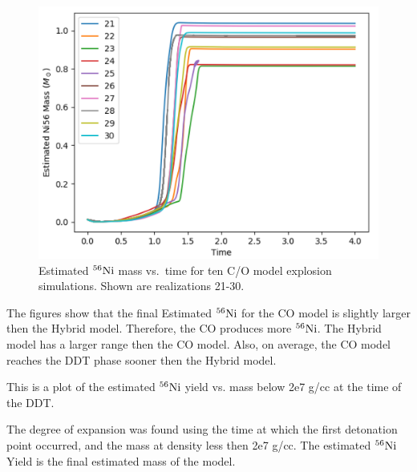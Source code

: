 \documentclass[iop,apj]{emulateapj}
\newcommand{\Ni}[1]{\ensuremath{{}^{#1}{\rm Ni}}}
\begin{document}
\begin{figure}
\includegraphics[width=\columnwidth]{figures/ni56_vs_time_CO.png}
\caption{\label{fig:nitco}
Estimated \Ni{56} mass vs.\ time for ten C/O model explosion simulations.
Shown are realizations 21-30. 
}
\end{figure}

The figures show that the final Estimated \Ni{56} for the CO model is
slightly larger then the Hybrid model. Therefore, the CO produces more
\Ni{56}. The Hybrid model has a larger range then the CO model. Also, on
average, the CO model reaches the DDT phase sooner then the Hybrid model.


This is a plot of the estimated \Ni{56} yield vs. mass below 2e7 g/cc at
the time of the DDT.

The degree of expansion was found using the time at which the first
detonation point occurred, and the mass at density less then 2e7 g/cc. The
estimated \Ni{56} Yield is the final estimated mass of the model.
\end{document}
